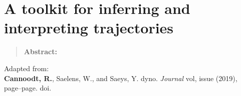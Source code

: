 \newpage{\thispagestyle{empty}\cleardoublepage}
\chapter{A toolkit for inferring and interpreting trajectories} 
\label{chap:dyno}

\begin{quote}
	\textbf{Abstract:} \blindtext
\end{quote}

\vfill

Adapted from:\\
\textbf{Cannoodt, R.}, Saelens, W., and Saeys, Y. dyno. \textit{Journal} vol, issue (2019), page--page. doi.
\newpage

\blindtext